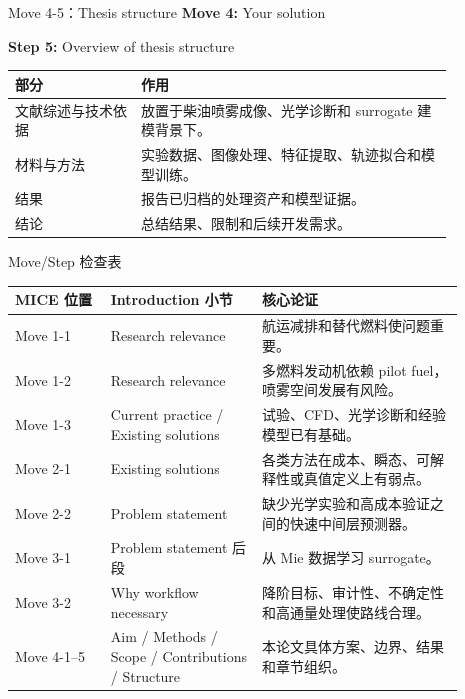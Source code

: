 \documentclass[aspectratio=169,11pt]{beamer}
\newcommand{\movetag}[2]{\textbf{Move #1:} #2}
\newcommand{\steptag}[2]{\textbf{Step #1:} #2}
\begin{document}
\begin{frame}{Move 4-5：Thesis structure}
\small
\movetag{4}{Your solution}

\vspace{0.5em}
\steptag{5}{Overview of thesis structure}

\vspace{0.8em}
\begin{tabular}{L{0.25\linewidth}L{0.62\linewidth}}
\toprule
部分 & 作用 \\
\midrule
文献综述与技术依据 & 放置于柴油喷雾成像、光学诊断和 surrogate 建模背景下。 \\
材料与方法 & 实验数据、图像处理、特征提取、轨迹拟合和模型训练。 \\
结果 & 报告已归档的处理资产和模型证据。 \\
结论 & 总结结果、限制和后续开发需求。 \\
\bottomrule
\end{tabular}
\end{frame}

\begin{frame}{Move/Step 检查表}
\small
\begin{tabular}{L{0.19\linewidth}L{0.30\linewidth}L{0.40\linewidth}}
\toprule
MICE 位置 & Introduction 小节 & 核心论证 \\
\midrule
Move 1-1 & Research relevance & 航运减排和替代燃料使问题重要。 \\
Move 1-2 & Research relevance & 多燃料发动机依赖 pilot fuel，喷雾空间发展有风险。 \\
Move 1-3 & Current practice / Existing solutions & 试验、CFD、光学诊断和经验模型已有基础。 \\
Move 2-1 & Existing solutions & 各类方法在成本、瞬态、可解释性或真值定义上有弱点。 \\
Move 2-2 & Problem statement & 缺少光学实验和高成本验证之间的快速中间层预测器。 \\
Move 3-1 & Problem statement 后段 & 从 Mie 数据学习 surrogate。 \\
Move 3-2 & Why workflow necessary & 降阶目标、审计性、不确定性和高通量处理使路线合理。 \\
Move 4-1--5 & Aim / Methods / Scope / Contributions / Structure & 本论文具体方案、边界、结果和章节组织。 \\
\bottomrule
\end{tabular}
\end{frame}
\end{document}
